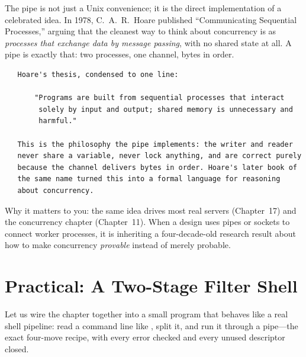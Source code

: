 \begin{researchnote}
The pipe is not just a Unix convenience; it is the direct implementation
of a celebrated idea. In 1978, C.~A.~R.~Hoare published
``Communicating Sequential Processes,'' arguing that the cleanest way
to think about concurrency is as \emph{processes that exchange data by
message passing}, with no shared state at all. A pipe is exactly that:
two processes, one channel, bytes in order.

\begin{verbatim}
   Hoare's thesis, condensed to one line:

       "Programs are built from sequential processes that interact
        solely by input and output; shared memory is unnecessary and
        harmful."

   This is the philosophy the pipe implements: the writer and reader
   never share a variable, never lock anything, and are correct purely
   because the channel delivers bytes in order. Hoare's later book of
   the same name turned this into a formal language for reasoning
   about concurrency.
\end{verbatim}

Why it matters to you: the same idea drives most real servers
(Chapter~17) and the concurrency chapter (Chapter~11). When a design
uses pipes or sockets to connect worker processes, it is inheriting a
four-decade-old research result about how to make concurrency
\emph{provable} instead of merely probable.

\end{researchnote}

\section{Practical: A Two-Stage Filter Shell}

Let us wire the chapter together into a small program that behaves like
a real shell pipeline: read a command line like
, split it, and run it through a pipe---the
exact four-move recipe, with every error checked and every unused
descriptor closed.

